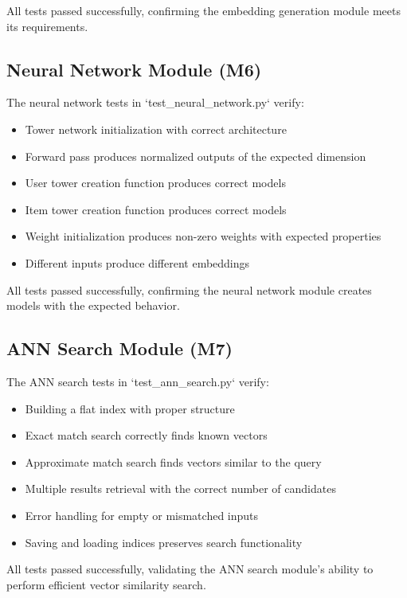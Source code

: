 \documentclass[12pt, titlepage]{article}
\begin{document}
All tests passed successfully, confirming the embedding generation module meets its requirements.

\subsection{Neural Network Module (M6)}
The neural network tests in `test\_neural\_network.py` verify:
\begin{itemize}
    \item Tower network initialization with correct architecture
    \item Forward pass produces normalized outputs of the expected dimension
    \item User tower creation function produces correct models
    \item Item tower creation function produces correct models
    \item Weight initialization produces non-zero weights with expected properties
    \item Different inputs produce different embeddings
\end{itemize}

All tests passed successfully, confirming the neural network module creates models with the expected behavior.

\subsection{ANN Search Module (M7)}
The ANN search tests in `test\_ann\_search.py` verify:
\begin{itemize}
    \item Building a flat index with proper structure
    \item Exact match search correctly finds known vectors
    \item Approximate match search finds vectors similar to the query
    \item Multiple results retrieval with the correct number of candidates
    \item Error handling for empty or mismatched inputs
    \item Saving and loading indices preserves search functionality
\end{itemize}

All tests passed successfully, validating the ANN search module's ability to perform efficient vector similarity search.
\end{document}
